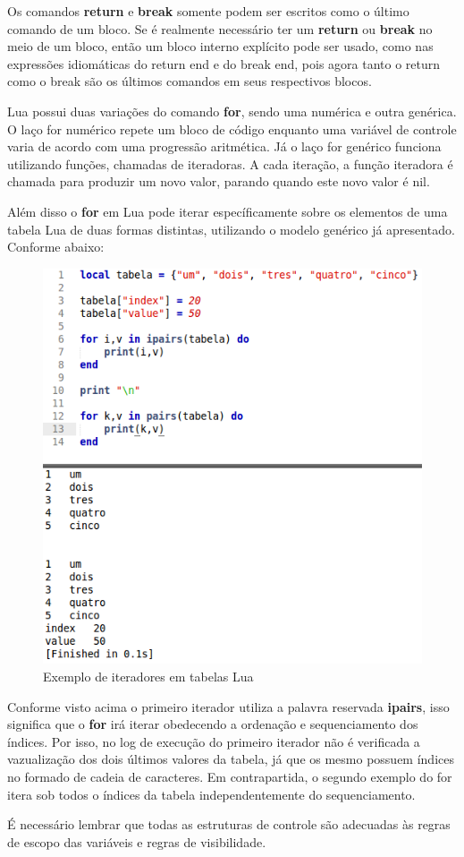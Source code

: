 \documentclass[
12pt, %
openright, %
oneside, %
a4paper, %
english, %
brazil, %
]{abntex2}
\begin{document}
Os comandos \textbf{return} e \textbf{break} somente podem ser escritos como o último comando de um bloco. Se é realmente necessário ter um \textbf{return} ou \textbf{break} no meio de um bloco, então um bloco interno explícito pode ser usado, como nas expressões idiomáticas do return end e do break end, pois agora tanto o return como o break são os últimos comandos em seus respectivos blocos.

Lua possui duas variações do comando \textbf{for}, sendo uma numérica e outra genérica. O laço for numérico repete um bloco de código enquanto uma variável de controle varia de acordo com uma progressão aritmética. Já o laço for genérico funciona utilizando funções, chamadas de iteradoras. A cada iteração, a função iteradora é chamada para produzir um novo valor, parando quando este novo valor é nil.

Além disso o \textbf{for} em Lua pode iterar específicamente sobre os elementos de uma tabela Lua de duas formas distintas, utilizando o modelo genérico já apresentado. Conforme abaixo:

\begin{figure}[H]
\centering
\includegraphics[width=0.5\linewidth]{imagens/for.png}
\caption{Exemplo de iteradores em tabelas Lua}
\end{figure}

Conforme visto acima o primeiro iterador utiliza a palavra reservada \textbf{ipairs}, isso significa que o \textbf{for} irá iterar obedecendo a ordenação e sequenciamento dos índices. Por isso, no log de execução do primeiro iterador não é verificada a vazualização dos dois últimos valores da tabela, já que os mesmo possuem índices no formado de cadeia de caracteres. Em contrapartida, o segundo exemplo do for itera sob todos o índices da tabela independentemente do sequenciamento.

É necessário lembrar que todas as estruturas de controle são adecuadas às regras de escopo das variáveis e regras de visibilidade. 
\end{document}
